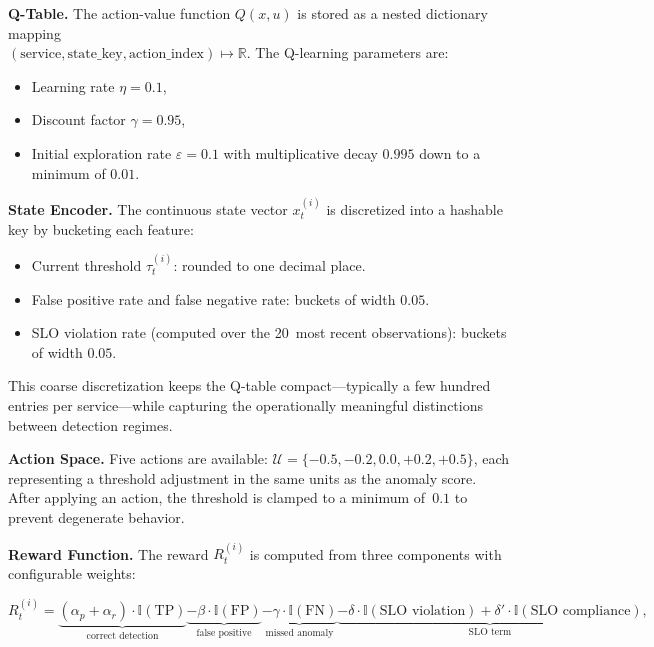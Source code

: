 \textbf{Q-Table.} The action-value function $Q(x,u)$ is stored as a nested
dictionary mapping \\ $(\text{service}, \text{state\_key}, \text{action\_index})
\mapsto \mathbb{R}$. The Q-learning parameters are:

\begin{itemize}
    \item Learning rate $\eta = 0.1$,
    \item Discount factor $\gamma = 0.95$,
    \item Initial exploration rate $\varepsilon = 0.1$ with multiplicative
          decay $0.995$ down to a minimum of $0.01$.
\end{itemize}

\textbf{State Encoder.} The continuous state vector $x_t^{(i)}$ is discretized
into a hashable key by bucketing each feature:

\begin{itemize}
    \item Current threshold $\tau_t^{(i)}$: rounded to one decimal place.
    \item False positive rate and false negative rate: buckets of width $0.05$.
    \item SLO violation rate (computed over the 20~most recent observations):
          buckets of width $0.05$.
\end{itemize}

This coarse discretization keeps the Q-table compact---typically a few hundred
entries per service---while capturing the operationally meaningful distinctions
between detection regimes.

\textbf{Action Space.} Five actions are available:
$\mathcal{U} = \{-0.5, -0.2, 0.0, +0.2, +0.5\}$, each representing a
threshold adjustment in the same units as the anomaly score. After applying an
action, the threshold is clamped to a minimum of~$0.1$ to prevent degenerate
behavior.

\textbf{Reward Function.} The reward $R_t^{(i)}$ is computed from three
components with configurable weights:

\begin{equation}
    R_t^{(i)} = \underbrace{(\alpha_p + \alpha_r) \cdot \mathbb{I}(\text{TP})}_{\text{correct detection}}
    \underbrace{- \beta \cdot \mathbb{I}(\text{FP})}_{\text{false positive}}
    \underbrace{- \gamma \cdot \mathbb{I}(\text{FN})}_{\text{missed anomaly}}
    \underbrace{- \delta \cdot \mathbb{I}(\text{SLO violation})+ \delta' \cdot \mathbb{I}(\text{SLO compliance})}_{\text{SLO term}},
\end{equation}

